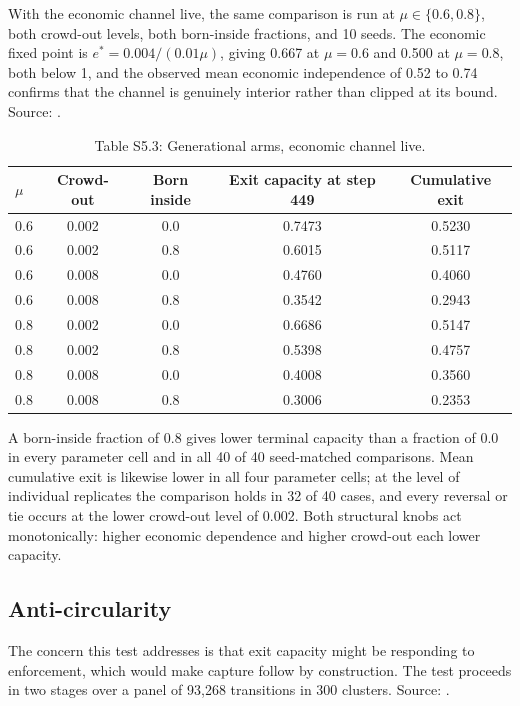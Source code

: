\documentclass[12pt]{article}
\begin{document}
With the economic channel live, the same comparison is run at
$\mu \in \{0.6, 0.8\}$, both crowd-out levels, both born-inside fractions, and
10 seeds. The economic fixed point is $e^{*} = 0.004/(0.01\mu)$, giving 0.667 at
$\mu=0.6$ and 0.500 at $\mu=0.8$, both below 1, and the observed mean economic
independence of 0.52 to 0.74 confirms that the channel is genuinely interior
rather than clipped at its bound. Source:
.

\begin{table}[htbp]
\centering
\small
\caption{Table S5.3: Generational arms, economic channel live.}
\begin{tabular}{lcccc}
\toprule
$\mu$ & Crowd-out & Born inside & Exit capacity at step 449 & Cumulative exit \\
\midrule
0.6 & 0.002 & 0.0 & 0.7473 & 0.5230 \\
0.6 & 0.002 & 0.8 & 0.6015 & 0.5117 \\
0.6 & 0.008 & 0.0 & 0.4760 & 0.4060 \\
0.6 & 0.008 & 0.8 & 0.3542 & 0.2943 \\
0.8 & 0.002 & 0.0 & 0.6686 & 0.5147 \\
0.8 & 0.002 & 0.8 & 0.5398 & 0.4757 \\
0.8 & 0.008 & 0.0 & 0.4008 & 0.3560 \\
0.8 & 0.008 & 0.8 & 0.3006 & 0.2353 \\
\bottomrule
\end{tabular}
\end{table}

A born-inside fraction of 0.8 gives lower terminal capacity than a fraction of
0.0 in every parameter cell and in all 40 of 40 seed-matched comparisons. Mean
cumulative exit is likewise lower in all four parameter cells; at the level of
individual replicates the comparison holds in 32 of 40 cases, and every reversal
or tie occurs at the lower crowd-out level of 0.002. Both structural knobs act
monotonically: higher economic dependence and higher crowd-out each lower
capacity.

\subsection{Anti-circularity}

The concern this test addresses is that exit capacity might be responding to
enforcement, which would make capture follow by construction. The test proceeds
in two stages over a panel of 93,268 transitions in 300 clusters. Source:
.
\end{document}

